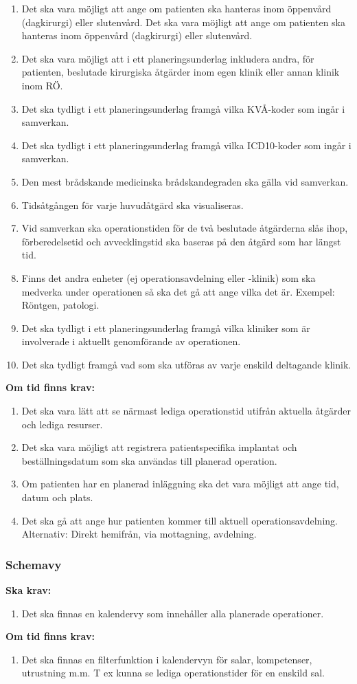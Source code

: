 \documentclass{article}
\begin{document}
\begin{enumerate}
\begin{enumerate}
\item Det ska vara möjligt att ange om patienten ska hanteras inom öppenvård
(dagkirurgi) eller slutenvård. Det ska vara möjligt att ange om patienten ska
hanteras inom öppenvård (dagkirurgi) eller slutenvård.
\item Det ska vara möjligt att i ett planeringsunderlag inkludera andra, för
patienten, beslutade kirurgiska åtgärder inom egen klinik eller annan klinik
inom RÖ.
\item Det ska tydligt i ett planeringsunderlag framgå vilka KVÅ-koder som ingår
i samverkan.
\item Det ska tydligt i ett planeringsunderlag framgå vilka ICD10-koder som
ingår i samverkan.
\item Den mest brådskande medicinska brådskandegraden ska gälla vid samverkan.
\item Tidsåtgången för varje huvudåtgärd ska visualiseras.
\item Vid samverkan ska operationstiden för de två beslutade åtgärderna slås
ihop, förberedelsetid och avvecklingstid ska baseras på den åtgärd som har
längst tid.
\item Finns det andra enheter (ej operationsavdelning eller -klinik) som ska
medverka under operationen så ska det gå att ange vilka det är.
Exempel: Röntgen, patologi.
\item Det ska tydligt i ett planeringsunderlag framgå vilka kliniker som är
involverade i aktuellt genomförande av operationen.
\item Det ska tydligt framgå vad som ska utföras av varje enskild deltagande
klinik.
\end{enumerate}
\textbf{Om tid finns krav:}
\begin{enumerate}
  \item Det ska vara lätt att se närmast lediga operationstid utifrån aktuella
  åtgärder och lediga resurser.
  \item Det ska vara möjligt att registrera patientspecifika implantat och
  beställningsdatum som ska användas till planerad operation.
  \item Om patienten har en planerad inläggning ska det vara möjligt att ange
  tid, datum och plats.
  \item Det ska gå att ange hur patienten kommer till aktuell
  operationsavdelning. Alternativ: Direkt hemifrån, via mottagning, avdelning.
\end{enumerate}
\subsubsection{Schemavy}
\textbf{Ska krav: }
\begin{enumerate}
\item Det ska finnas en kalendervy som innehåller alla planerade operationer.
\end{enumerate}
\textbf{Om tid finns krav:}
\begin{enumerate}
\item Det ska finnas en filterfunktion i kalendervyn för salar, kompetenser, utrustning m.m. T ex kunna se lediga operationstider för en enskild sal.
\end{enumerate}

\end{enumerate}
\end{document}
